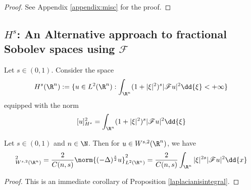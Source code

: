 \documentclass[../main.tex]{subfiles}
\begin{document}
\begin{proof}
    See Appendix \ref{appendix:misc} for the proof.
\end{proof}



\subsection{$ H^{s} $: An Alternative approach to fractional Sobolev spaces using $ \mathscr{F} $}

\begin{definition}
    Let $ s\in (0,1) $. Consider the space
    \[
         H^{s}(\R^{n}) := \{ u\in L^{2}(\R^{n}): \int_{\R^{n}}(1+| \xi|^{2})^{s}|\mathscr{F}u|^{2}\dd{\xi} < +\infty\} 
    \]
    equipped with the norm
    \[
        [u]_{H^{s}}^{2} = \int_{\R^{n}}(1+| \xi|^{2})^{s}|\mathscr{F}u|^{2}\dd{\xi} 
    \]
\end{definition}



\begin{proposition}\label{fracnormislaplacian}
    Let $ s\in (0,1) $ and $ n\in \N $. Then for $ u\in W^{s,2}(\R^{n}) $, we have 
    \begin{equation}
        [u]_{W^{s,2}(\R^{n})}^{2} = \frac{2}{C(n,s)} \norm{(-\Delta )^{\frac{s}{2}}u}_{L^{2}(\R^{n})}^{2} = \frac{2}{C(n,s)} \int_{\R^{n}} | \xi|^{2s} |\mathscr{F}u|^{2} \dd{x} 
    \end{equation}
\end{proposition}

\begin{proof}
    This is an immediate corollary of Proposition \ref{laplacianisintegral}.
\end{proof}
\end{document}
